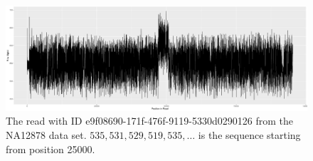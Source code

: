 \begin{figure}
\centering
\includegraphics[scale=0.31]{plots/reads.e9f08690-171f-476f-9119-5330d0290126.raw.pdf}
	\caption{\label{fig:read-e9f}The read with ID e9f08690-171f-476f-9119-5330d0290126 from the NA12878 data set. $535, 531, 529, 519, 535,\dots$ is the sequence starting from position 25000.}
\end{figure}
